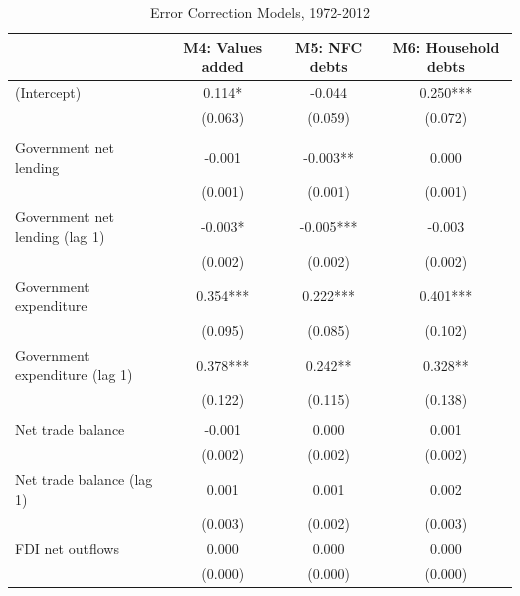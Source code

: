\documentclass[
]{article}
\begin{document}
\begin{table}

\caption{\label{tab:unnamed-chunk-4}Error Correction Models, 1972-2012}
\centering
\begin{tabular}[t]{lccc}
\toprule
  & M4: Values added & M5: NFC debts & M6: Household debts\\
\midrule
(Intercept) & 0.114* & -0.044 & 0.250***\\
 & (0.063) & (0.059) & (0.072)\\
\addlinespace[0.3em]
\multicolumn{4}{l}{\textbf{Statecraft contigency}}\\
\hspace{1em}Government net lending & -0.001 & -0.003** & 0.000\\
\hspace{1em} & (0.001) & (0.001) & \vphantom{1} (0.001)\\
\hspace{1em}Government net lending (lag 1) & -0.003* & -0.005*** & -0.003\\
\hspace{1em} & (0.002) & (0.002) & \vphantom{2} (0.002)\\
\hspace{1em}Government expenditure & 0.354*** & 0.222*** & 0.401***\\
\hspace{1em} & (0.095) & (0.085) & (0.102)\\
\hspace{1em}Government expenditure (lag 1) & 0.378*** & 0.242** & 0.328**\\
\hspace{1em} & (0.122) & (0.115) & (0.138)\\
\addlinespace[0.3em]
\multicolumn{4}{l}{\textbf{Development pitfall}}\\
\hspace{1em}Net trade balance & -0.001 & 0.000 & 0.001\\
\hspace{1em} & (0.002) & (0.002) & \vphantom{1} (0.002)\\
\hspace{1em}Net trade balance (lag 1) & 0.001 & 0.001 & 0.002\\
\hspace{1em} & (0.003) & (0.002) & (0.003)\\
\hspace{1em}FDI net outflows & 0.000 & 0.000 & 0.000\\
\hspace{1em} & (0.000) & (0.000) & \vphantom{2} (0.000)\\

\end{tabular}
\end{table}
\end{document}

